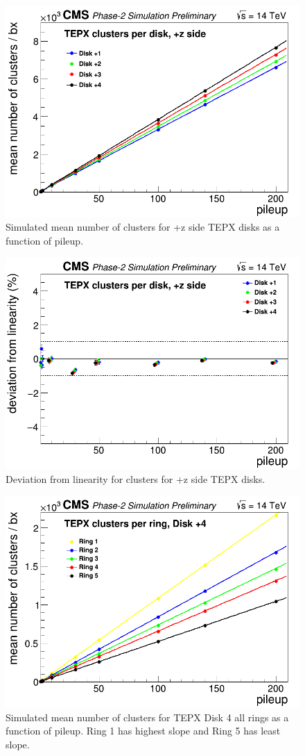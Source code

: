 \begin{figure}[H]
  \centering
  \includegraphics[width=0.5\columnwidth]{./TEPX_clusters_per_disk_positivez_linearity.png}
  \caption{Simulated mean number of clusters for +z side TEPX disks as a function of pileup.}
  \label{fig:CMS}
\end{figure}


\begin{figure}[H]
  \centering
  \includegraphics[width=0.5\columnwidth]{./TEPX_clusters_per_disk_postivez_Linearity_residuals.png}
  \caption{Deviation from linearity for clusters for +z side TEPX disks.}
  \label{fig:CMS}
\end{figure}

\begin{figure}[H]
  \centering
  \includegraphics[width=0.5\columnwidth]{./TEPX_clusters_per_ringDisk4_Linearity.png}
  \caption{Simulated mean number of clusters for TEPX Disk 4 all rings as a function of pileup. Ring 1 has highest slope and Ring 5 has least slope.}
  \label{fig:CMS}
\end{figure}


